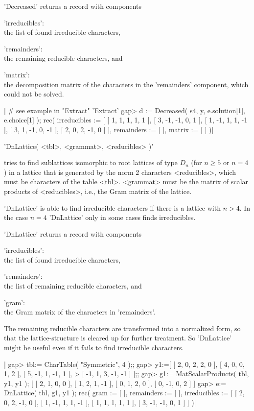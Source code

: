 'Decreased' returns a record with components

'irreducibles':\\
      the list of found irreducible characters,

'remainders':\\
      the remaining reducible characters, and

'matrix':\\
      the decomposition matrix of the characters in the 'remainders'
      component, which could not be solved.

|    # see example in "Extract" 'Extract'
    gap> d := Decreased( s4, y, e.solution[1], e.choice[1] );
    rec(
      irreducibles :=
       [ [ 1, 1, 1, 1, 1 ], [ 3, -1, -1, 0, 1 ], [ 1, -1, 1, 1, -1 ],
          [ 3, 1, -1, 0, -1 ], [ 2, 0, 2, -1, 0 ] ],
      remainders := [  ],
      matrix := [  ] )|

%

'DnLattice( <tbl>, <grammat>, <reducibles> )'

tries to find sublattices isomorphic to root  lattices of type $D_n$ (for
$n \geq 5$  or $n =  4$)  in a lattice that   is generated by the norm  2
characters  <reducibles>,  which must be  characters  of the table <tbl>.
<grammat>  must be the matrix  of scalar products  of <reducibles>, i.e.,
the Gram matrix of the lattice.

'DnLattice' is able to find irreducible characters  if there is a lattice
with  $n>4$.  In the case  $n = 4$ 'DnLattice'  only  in some cases finds
irreducibles.

'DnLattice' returns a record with components

'irreducibles':\\
       the list of found irreducible characters,

'remainders':\\
       the list of remaining reducible characters, and

'gram':\\
       the Gram matrix of the characters in 'remainders'.

The remaining   reducible  characters are transformed  into  a normalized
form, so that the lattice-structure is  cleared up for further treatment.
So  'DnLattice' might be   useful even if  it  fails to find  irreducible
characters.

|    gap> tbl:= CharTable( "Symmetric", 4 );;
    gap> y1:=[ [ 2, 0, 2, 2, 0 ], [ 4, 0, 0, 1, 2 ], [ 5, -1, 1, -1, 1 ],
    >          [ -1, 1, 3, -1, -1 ] ];;
    gap> g1:= MatScalarProducts( tbl, y1, y1 );
    [ [ 2, 1, 0, 0 ], [ 1, 2, 1, -1 ], [ 0, 1, 2, 0 ], [ 0, -1, 0, 2 ] ]
    gap> e:= DnLattice( tbl, g1, y1 );
    rec(
      gram := [  ],
      remainders := [  ],
      irreducibles :=
       [ [ 2, 0, 2, -1, 0 ], [ 1, -1, 1, 1, -1 ], [ 1, 1, 1, 1, 1 ],
          [ 3, -1, -1, 0, 1 ] ] )|

